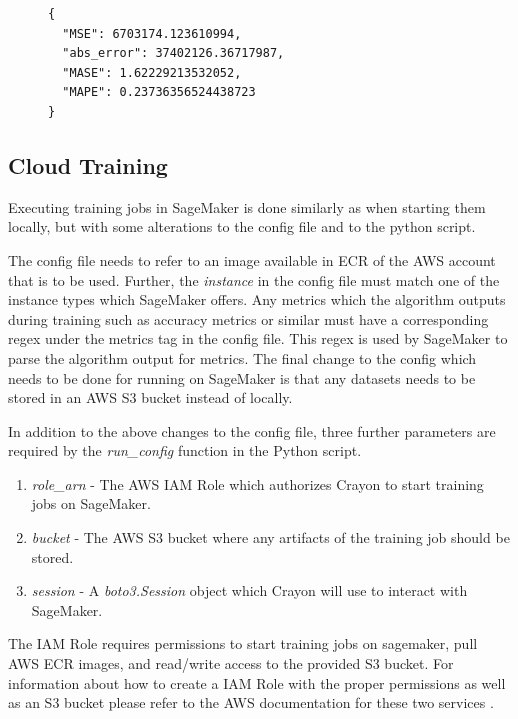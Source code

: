 \begin{figure}
  \begin{lstlisting}[label={output:local_job_output}, caption=Example of a training job output file such as \textit{metrics.json} or \textit{agg\_metrics.json}]
{
  "MSE": 6703174.123610994,
  "abs_error": 37402126.36717987,
  "MASE": 1.62229213532052,
  "MAPE": 0.23736356524438723
}
\end{lstlisting}
\end{figure}


\subsection{Cloud Training}
\label{sec:cloud_training}
Executing training jobs in SageMaker is done similarly as when starting them locally, but with some alterations to the config file and to the python script.

The config file needs to refer to an image available in ECR of the AWS account that is to be used. Further, the \textit{instance} in the config file must match one of the instance types which SageMaker offers. Any metrics which the algorithm outputs during training such as accuracy metrics or similar must have a corresponding regex under the metrics tag in the config file. This regex is used by SageMaker to parse the algorithm output for metrics. The final change to the config which needs to be done for running on SageMaker is that any datasets needs to be stored in an AWS S3 bucket instead of locally.

In addition to the above changes to the config file, three further parameters are required by the \textit{run\_config} function in the Python script.

\begin{enumerate}
  \item \textit{role\_arn} - The AWS IAM Role  which authorizes Crayon to start training jobs on SageMaker.
  \item \textit{bucket} - The AWS S3 bucket where any artifacts of the training job should be stored.
  \item \textit{session} - A \textit{boto3.Session} object which Crayon will use to interact with SageMaker.
\end{enumerate}

The IAM Role requires permissions to start training jobs on sagemaker, pull AWS ECR images, and read/write access to the provided S3 bucket. For information about how to create a IAM Role with the proper permissions as well as an S3 bucket please refer to the AWS documentation for these two services \cite{iam_website,s3_website}.

